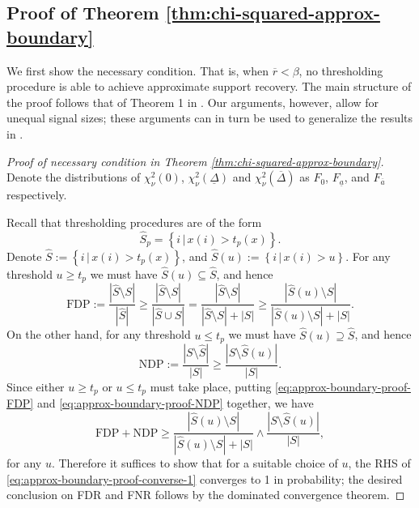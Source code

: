 \subsection{Proof of Theorem \ref{thm:chi-squared-approx-boundary}}
\label{subsec:proof-chi-squared-approx-boundary}

We first show the necessary condition. 
That is, when $\overline{r} < \beta$, no thresholding procedure is able to achieve approximate support recovery.
The main structure of the proof follows that of Theorem 1 in \citet{arias2017distribution}. 
Our arguments, however, allow for unequal signal sizes; these arguments can in turn be used to generalize the results in \cite{arias2017distribution}.

\begin{proof}[Proof of necessary condition in Theorem \ref{thm:chi-squared-approx-boundary}]
Denote the distributions of $\chi^2_\nu(0)$, $\chi^2_\nu(\underline{\Delta})$ and $\chi^2_\nu(\overline{\Delta})$ as $F_0$, $F_{\underline{a}}$, and $F_{\overline{a}}$ respectively.


Recall that thresholding procedures are of the form
$$
\widehat{S}_p = \left\{i\,|\,x(i) > t_p(x)\right\}.
$$
Denote $\widehat{S} := \left\{i\,|\,x(i) > t_p(x)\right\}$, and $\widehat{S}(u) := \left\{i\,|\,x(i) > u\right\}$.
For any threshold $u\ge t_p$ we must have $\widehat{S}(u)\subseteq\widehat{S}$, and hence
\begin{equation} \label{eq:approx-boundary-proof-FDP}
    \text{FDP} := \frac{|\widehat{S}\setminus{S}|}{|\widehat{S}|} \ge \frac{|\widehat{S}\setminus{S}|}{|\widehat{S}\cup{S}|} = \frac{|\widehat{S}\setminus{S}|}{|\widehat{S}\setminus{S}| + |S|} \ge
    \frac{|\widehat{S}(u)\setminus{S}|}{|\widehat{S}(u)\setminus{S}| + |S|}.
\end{equation}
On the other hand, for any threshold $u\le t_p$ we must have $\widehat{S}(u)\supseteq\widehat{S}$, and hence
\begin{equation} \label{eq:approx-boundary-proof-NDP}
    \text{NDP} := \frac{|{S}\setminus\widehat{S}|}{|{S}|} \ge 
    \frac{|{S}\setminus\widehat{S}(u)|}{|{S}|}.
\end{equation}
Since either $u\ge t_p$ or  $u\le t_p$ must take place, putting \eqref{eq:approx-boundary-proof-FDP} and \eqref{eq:approx-boundary-proof-NDP} together, we have
\begin{equation} \label{eq:approx-boundary-proof-converse-1}
    \text{FDP} + \text{NDP} 
    \ge \frac{|\widehat{S}(u)\setminus{S}|}{|\widehat{S}(u)\setminus{S}|+|{S}|} \wedge \frac{|{S}\setminus\widehat{S}(u)|}{|{S}|},
\end{equation}
for any $u$.
Therefore it suffices to show that for a suitable choice of $u$, the RHS of \eqref{eq:approx-boundary-proof-converse-1} converges to 1 in probability; the desired conclusion on FDR and FNR follows by the dominated convergence theorem.


\end{proof}
